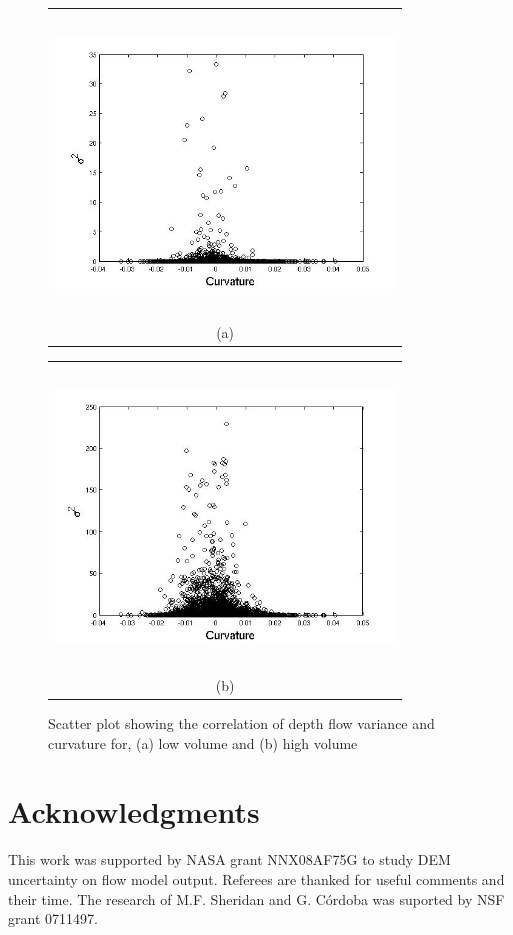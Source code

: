 \documentclass[a4paper,fleqn]{article}
\begin{document}
\begin{figure}[H]
    \begin{minipage}[b]{0.6\textwidth}
        \begin{tabular}{c}
        \includegraphics[width=9cm,height=8cm,keepaspectratio]{curvature_vs_sigma2_res.jpg}\\
        (a)
        \end{tabular}
    \end{minipage}
    \begin{minipage}{0.6\textwidth}
        \begin{tabular}{c}
        \includegraphics[width=9cm,height=8cm,keepaspectratio]{curvature_vs_sigma2_high_vol_res.jpg}\\
        (b)
        \end{tabular}
    \end{minipage} 
\caption{Scatter plot showing the correlation of depth flow variance and curvature for, (a) low volume and (b) high volume}
\label{fig7}  
\end{figure}




\section*{Acknowledgments}
This work was supported by NASA grant NNX08AF75G to study DEM
uncertainty on flow model output.  Referees are thanked for useful
comments and their time. The research of M.F. Sheridan and G. C\'ordoba was suported by NSF grant 0711497.




\end{document}
